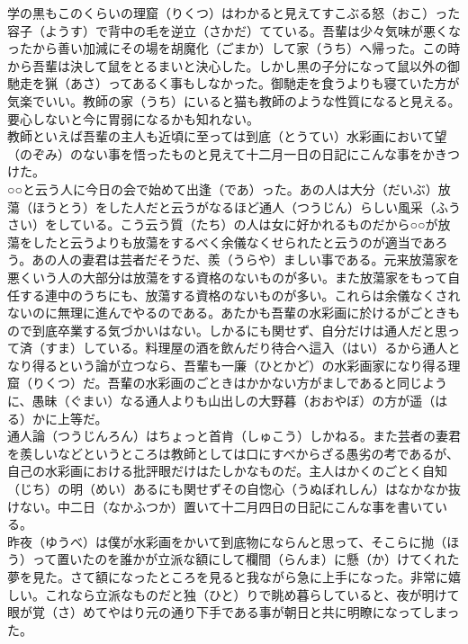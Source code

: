 \documentclass{book}
\begin{document}
学の黒もこのくらいの理窟（りくつ）はわかると見えてすこぶる怒（おこ）った容子（ようす）で背中の毛を逆立（さかだ）てている。吾輩は少々気味が悪くなったから善い加減にその場を胡魔化（ごまか）して家（うち）へ帰った。この時から吾輩は決して鼠をとるまいと決心した。しかし黒の子分になって鼠以外の御馳走を猟（あさ）ってあるく事もしなかった。御馳走を食うよりも寝ていた方が気楽でいい。教師の家（うち）にいると猫も教師のような性質になると見える。要心しないと今に胃弱になるかも知れない。\\
教師といえば吾輩の主人も近頃に至っては到底（とうてい）水彩画において望（のぞみ）のない事を悟ったものと見えて十二月一日の日記にこんな事をかきつけた。\\

○○と云う人に今日の会で始めて出逢（であ）った。あの人は大分（だいぶ）放蕩（ほうとう）をした人だと云うがなるほど通人（つうじん）らしい風采（ふうさい）をしている。こう云う質（たち）の人は女に好かれるものだから○○が放蕩をしたと云うよりも放蕩をするべく余儀なくせられたと云うのが適当であろう。あの人の妻君は芸者だそうだ、羨（うらや）ましい事である。元来放蕩家を悪くいう人の大部分は放蕩をする資格のないものが多い。また放蕩家をもって自任する連中のうちにも、放蕩する資格のないものが多い。これらは余儀なくされないのに無理に進んでやるのである。あたかも吾輩の水彩画に於けるがごときもので到底卒業する気づかいはない。しかるにも関せず、自分だけは通人だと思って済（すま）している。料理屋の酒を飲んだり待合へ這入（はい）るから通人となり得るという論が立つなら、吾輩も一廉（ひとかど）の水彩画家になり得る理窟（りくつ）だ。吾輩の水彩画のごときはかかない方がましであると同じように、愚昧（ぐまい）なる通人よりも山出しの大野暮（おおやぼ）の方が遥（はる）かに上等だ。\\

通人論（つうじんろん）はちょっと首肯（しゅこう）しかねる。また芸者の妻君を羨しいなどというところは教師としては口にすべからざる愚劣の考であるが、自己の水彩画における批評眼だけはたしかなものだ。主人はかくのごとく自知（じち）の明（めい）あるにも関せずその自惚心（うぬぼれしん）はなかなか抜けない。中二日（なかふつか）置いて十二月四日の日記にこんな事を書いている。\\

昨夜（ゆうべ）は僕が水彩画をかいて到底物にならんと思って、そこらに抛（ほう）って置いたのを誰かが立派な額にして欄間（らんま）に懸（か）けてくれた夢を見た。さて額になったところを見ると我ながら急に上手になった。非常に嬉しい。これなら立派なものだと独（ひと）りで眺め暮らしていると、夜が明けて眼が覚（さ）めてやはり元の通り下手である事が朝日と共に明瞭になってしまった。\\
\end{document}

